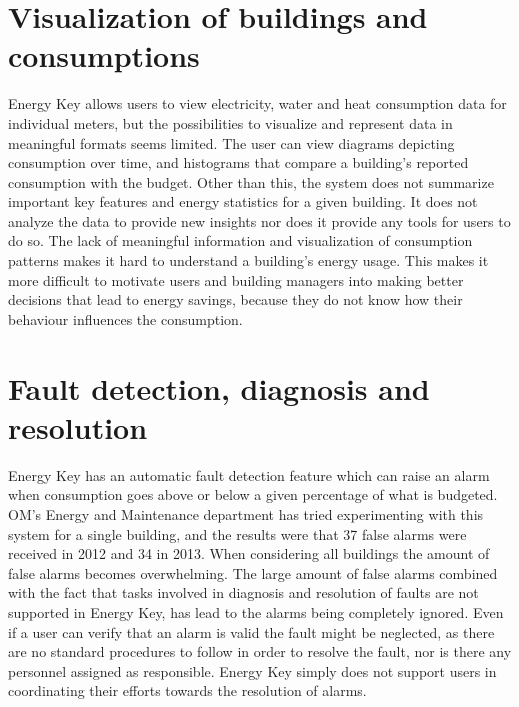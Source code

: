 \section*{Visualization of buildings and consumptions}
Energy Key allows users to view electricity, water and heat consumption data for individual meters, but the possibilities to visualize and represent data in meaningful formats seems limited. The user can view diagrams depicting consumption over time, and histograms that compare a building’s reported consumption with the budget. Other than this, the system does not summarize important key features and energy statistics for a given building. It does not analyze the data to provide new insights nor does it provide any tools for users to do so. The lack of meaningful information and visualization of consumption patterns makes it hard to understand a building’s energy usage. This makes it more difficult to motivate users and building managers into making better decisions that lead to energy savings, because they do not know how their behaviour influences the consumption.
\section*{Fault detection, diagnosis and resolution}
 Energy Key has an automatic fault detection feature which can raise an alarm when consumption goes above or below a given percentage of what is budgeted. OM’s Energy and Maintenance department has tried experimenting with this system for a single building, and the results were that 37 false alarms were received in 2012 and 34 in 2013. When considering all buildings the amount of false alarms becomes overwhelming. The large amount of false alarms combined with the fact that tasks involved in diagnosis and resolution of faults are not supported in Energy Key, has lead to the alarms being completely ignored. Even if a user can verify that an alarm is valid the fault might be neglected, as there are no standard procedures to follow in order to resolve the fault, nor is there any personnel assigned as responsible. Energy Key simply does not support users in coordinating their efforts towards the resolution of alarms.
